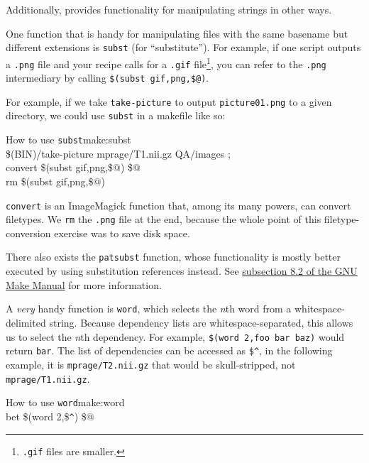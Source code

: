 Additionally, \maken{} provides functionality for manipulating strings in other ways.

One function that is handy for manipulating files with the same basename but different extensions is \texttt{subst} (for ``substitute''). For example, if one script outputs a \texttt{.png} file and your recipe calls for a \texttt{.gif} file\footnote{\texttt{.gif} files are smaller.}, you can refer to the \texttt{.png} intermediary by calling \texttt{\$({\color{blue}subst} gif,png,\$@)}.

For example, if we take \texttt{take-picture} to output \texttt{picture01.png} to a given directory, we could use \texttt{subst} in a makefile like so:

\begin{make}{How to use \texttt{subst}}{make:subst}
	 \\
	\tab \$(BIN)/take-picture mprage/T1.nii.gz QA/images ;\ \\
	\tab convert \$(subst gif,png,\$@) \$@ \\ 
	\tab rm \$(subst gif,png,\$@)
\end{make}

\texttt{convert} is an ImageMagick function that, among its many powers, can convert filetypes. We \texttt{rm} the \texttt{.png} file at the end, because the whole point of this filetype-conversion exercise was to save disk space.

There also exists the \texttt{patsubst} function, whose functionality is mostly better executed by using substitution references instead. See \href{https://www.gnu.org/software/make/manual/html_node/Text-Functions.html#Text-Functions}{subsection 8.2 of the GNU Make Manual} for more information.

A \textit{very} handy function is \texttt{word}, which selects the \textit{n}th word from a whitespace-delimited string. Because dependency lists are whitespace-separated, this allows us to select the \textit{n}th dependency. For example, \texttt{\$({\color{blue}word} 2,foo bar baz)} would return \texttt{bar}. The list of dependencies can be accessed as \texttt{\$\^}, in the following example, it is \texttt{mprage/T2.nii.gz} that would be skull-stripped, not \texttt{mprage/T1.nii.gz}.

\begin{make}{How to use \texttt{word}}{make:word}
	 \\
	\tab bet \$(word 2,\$\verb!^!) \$@\\
\end{make}

